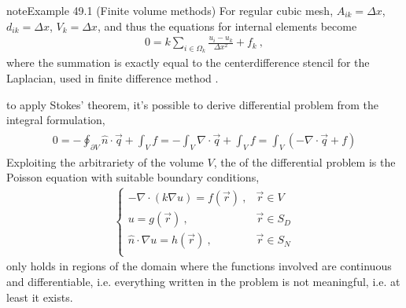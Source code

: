\documentclass[letterpaper,10pt,english]{jupyterBook}
\begin{document}
\begin{sphinxadmonition}{note}{Example 49.1 (Finite volume methods)}
\sphinxAtStartPar
For regular cubic mesh, \(A_{ik} = \Delta x\), \(d_{ik} = \Delta x\), \(V_k = \Delta x\), and thus the equations for internal elements become
\begin{equation*}
\begin{split}0 = k \sum_{i \in \Omega_k} \frac{u_i - u_k}{\Delta x^2} + f_k \ ,\end{split}
\end{equation*}
\sphinxAtStartPar
where the summation is exactly equal to the center\sphinxhyphen{}difference stencil for the Laplacian, used in finite difference method {\hyperref[\detokenize{ch/pde/numerics:pde:ex:fdm}]{}}.
\end{sphinxadmonition}

\sphinxAtStartPar
{} to apply Stokes’ theorem, it’s possible to derive differential problem from the integral formulation,
\begin{equation*}
\begin{split}\begin{aligned}
  0 
    = - \oint_{\partial V} \hat{n} \cdot \vec{q} + \int_{V} f 
    = - \int_{V} \nabla \cdot \vec{q} + \int_{V} f = \int_{V} \left( - \nabla \cdot \vec{q} + f  \right)
\end{aligned}\end{split}
\end{equation*}
\sphinxAtStartPar
Exploiting the arbitrariety of the volume \(V\), the  of the differential problem is the Poisson equation with suitable boundary conditions,
\begin{equation*}
\begin{split}\begin{cases}
  - \nabla \cdot \left( k \nabla u \right) = f(\vec{r}) \ , & \vec{r} \in V \\
  u = g(\vec{r})                                        \ , & \vec{r} \in S_{D} \\
  \hat{n} \cdot \nabla u = h(\vec{r})                   \ , & \vec{r} \in S_{N}  \\
\end{cases}\end{split}
\end{equation*}
\sphinxAtStartPar
only holds in regions of the domain where the functions involved are continuous and differentiable, i.e. everything written in the problem is not meaningful, i.e. at least it exists.
\label{ch/pde/numerics:pde:ex:fdm}
\end{document}
